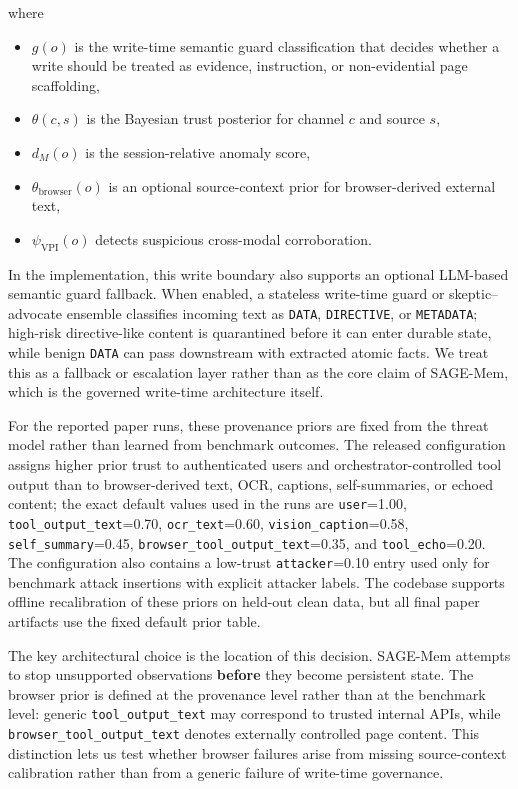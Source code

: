 \documentclass{article}
\begin{document}
where
\begin{itemize}
\item \(g(o)\) is the write-time semantic guard classification that decides whether a write should be treated as evidence, instruction, or non-evidential page scaffolding,
\item \(\theta(c,s)\) is the Bayesian trust posterior for channel \(c\) and source \(s\),
\item \(d_M(o)\) is the session-relative anomaly score,
\item \(\theta_{\mathrm{browser}}(o)\) is an optional source-context prior for browser-derived external text,
\item \(\psi_{\mathrm{VPI}}(o)\) detects suspicious cross-modal corroboration.
\end{itemize}

In the implementation, this write boundary also supports an optional LLM-based semantic guard fallback. When enabled, a stateless write-time guard or skeptic--advocate ensemble classifies incoming text as \texttt{DATA}, \texttt{DIRECTIVE}, or \texttt{METADATA}; high-risk directive-like content is quarantined before it can enter durable state, while benign \texttt{DATA} can pass downstream with extracted atomic facts. We treat this as a fallback or escalation layer rather than as the core claim of SAGE-Mem, which is the governed write-time architecture itself.

For the reported paper runs, these provenance priors are fixed from the threat model rather than learned from benchmark outcomes. The released configuration assigns higher prior trust to authenticated users and orchestrator-controlled tool output than to browser-derived text, OCR, captions, self-summaries, or echoed content; the exact default values used in the runs are \texttt{user}=1.00, \texttt{tool\_output\_text}=0.70, \texttt{ocr\_text}=0.60, \texttt{vision\_caption}=0.58, \texttt{self\_summary}=0.45, \texttt{browser\_tool\_output\_text}=0.35, and \texttt{tool\_echo}=0.20. The configuration also contains a low-trust \texttt{attacker}=0.10 entry used only for benchmark attack insertions with explicit attacker labels. The codebase supports offline recalibration of these priors on held-out clean data, but all final paper artifacts use the fixed default prior table.

The key architectural choice is the location of this decision. SAGE-Mem attempts to stop unsupported observations \textbf{before} they become persistent state. The browser prior is defined at the provenance level rather than at the benchmark level: generic \texttt{tool\_output\_text} may correspond to trusted internal APIs, while \texttt{browser\_tool\_output\_text} denotes externally controlled page content. This distinction lets us test whether browser failures arise from missing source-context calibration rather than from a generic failure of write-time governance.
\end{document}
